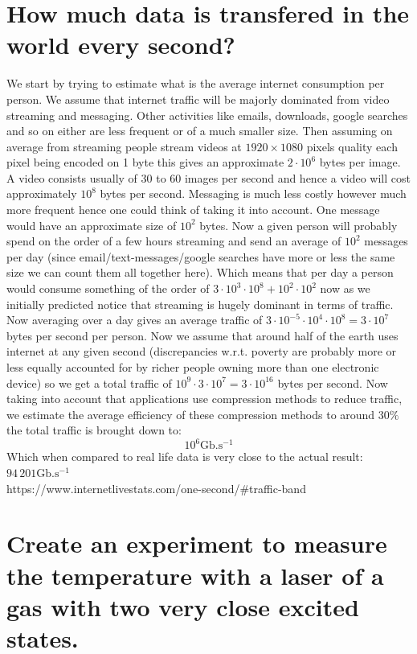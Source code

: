 \documentclass[10pt,a4paper]{article}
\begin{document}
\section{How much data is transfered in the world every second?}
We start by trying to estimate what is the average internet consumption per person. We assume that internet traffic will be majorly dominated from video streaming and messaging. Other activities like emails, downloads, google searches and so on either are less frequent or of a much smaller size. Then assuming on average from streaming people stream videos at $1920\times 1080$ pixels quality each pixel being encoded on 1 byte this gives an approximate $2\cdot 10^6$ bytes per image. A video consists usually of $30$ to $60$ images per second and hence a video will cost approximately $10^8$ bytes per second. Messaging is much less costly however much more frequent hence one could think of taking it into account. One message would have an approximate size of $10^2$ bytes. Now a given person will probably spend on the order of a few hours streaming and send an average of $10^2$ messages per day (since email/text-messages/google searches have more or less the same size we can count them all together here). Which means that per day a person would consume something of the order of $3 \cdot 10^3 \cdot 10^8 + 10^2 \cdot 10^2$ now as we initially predicted notice that streaming is hugely dominant in terms of traffic. Now averaging over a day gives an average traffic of $3 \cdot 10^{-5} \cdot 10^4 \cdot 10^8 = 3 \cdot 10^7$ bytes per second per person. Now we assume that around half of the earth uses internet at any given second (discrepancies w.r.t. poverty are probably more or less equally accounted for by richer people owning more than one electronic device) so we get a total traffic of $10^9 \cdot 3 \cdot 10^7 = 3 \cdot 10^{16}$ bytes per second. Now taking into account that applications use compression methods to reduce traffic, we estimate the average efficiency of these compression methods to around $30\%$ the total traffic is brought down to:
\[
10^6 \text{Gb}.\text{s}^{-1}
\]
Which when compared to real life data is very close to the actual result: $94\,201 \text{Gb}.\text{s}^{-1}$\\
https://www.internetlivestats.com/one-second/\#traffic-band

\section{Create an experiment to measure the temperature with a laser of a gas with two very close excited states.}
\end{document}
